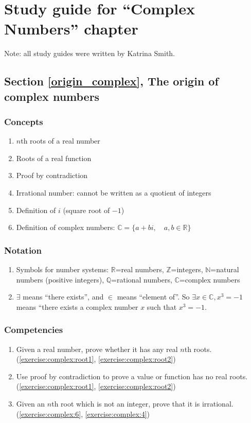\section{Study guide  for ``Complex Numbers''  chapter}
\label{sec:ComplexNumbers:StudyGuide} 

Note: all study guides were written by Katrina Smith.

\subsection*{Section \ref{origin_complex}, The origin of complex numbers}
\subsubsection*{Concepts}
\begin{enumerate}
\item 
$n$th roots of a real number
\item
Roots of a real function
\item
Proof by contradiction
\item
Irrational number: cannot be written as a quotient of integers
\item
Definition of $i$ (square root of $-1$)
\item
Definition of complex numbers:  $\mathbb{C}=\{a+bi, \quad a,b \in \mathbb{R} \}$
\end{enumerate}

\subsubsection*{Notation}
\begin{enumerate}
\item
Symbols for number systems: $\mathbb{R}$=real numbers, $\mathbb{Z}$=integers, $\mathbb{N}$=natural numbers (positive integers), $\mathbb{Q}$=rational numbers, $\mathbb{C}$=complex numbers
\item $\exists$ means ``there exists'',  and $\in$ means ``element of''. So $\exists x \in \mathbb{C}, x^3 = -1$ means ``there exists a complex number $x$ such that $x^3=-1$.
\end{enumerate}

\subsubsection*{Competencies}
\begin{enumerate}
\item
Given a real number, prove whether it has any real $n$th roots.  (\ref{exercise:complex:root1}, \ref{exercise:complex:root2}) 
\item
Use proof by contradiction to prove a value or function has no real roots. (\ref{exercise:complex:root1}, \ref{exercise:complex:root2})
\item	
Given an $n$th root which is not an integer, prove that it is irrational. (\ref{exercise:complex:6}, \ref{exercise:complex:4})
\end{enumerate}


